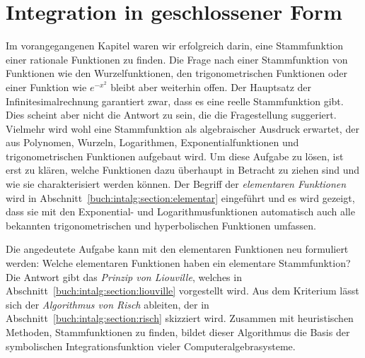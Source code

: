 %
%
%
\chapter{Integration in geschlossener Form
\label{chapter:intalg}}
Im vorangegangenen Kapitel waren wir erfolgreich darin, eine Stammfunktion
einer rationale Funktionen zu finden.
Die Frage nach einer Stammfunktion von Funktionen wie den
Wurzelfunktionen, den trigonometrischen Funktionen oder einer Funktion
wie $e^{-x^2}$ bleibt aber weiterhin offen.
Der Hauptsatz der Infinitesimalrechnung garantiert zwar, dass es
eine reelle Stammfunktion gibt.
Dies scheint aber nicht die Antwort zu sein, die die Fragestellung
suggeriert.
Vielmehr wird wohl eine Stammfunktion als algebraischer Ausdruck
erwartet, der aus Polynomen, Wurzeln, Logarithmen, Exponentialfunktionen
und trigonometrischen Funktionen aufgebaut wird.
Um diese Aufgabe zu lösen, ist erst zu klären, welche Funktionen
dazu überhaupt in Betracht zu ziehen sind und wie sie charakterisiert
werden können.
Der Begriff der \emph{elementaren Funktionen} wird in
Abschnitt~\ref{buch:intalg:section:elementar} eingeführt und es
wird gezeigt, dass sie mit den Exponential- und Logarithmusfunktionen
automatisch auch alle bekannten trigonometrischen und hyperbolischen
Funktionen umfassen.

Die angedeutete Aufgabe kann mit den elementaren Funktionen neu
formuliert werden: Welche elementaren Funktionen haben ein elementare
Stammfunktion?
Die Antwort gibt das \emph{Prinzip von Liouville}, welches in
Abschnitt~\ref{buch:intalg:section:liouville} vorgestellt wird.
Aus dem Kriterium lässt sich der \emph{Algorithmus von Risch}
ableiten, der in Abschnitt~\ref{buch:intalg:section:risch}
skizziert wird.
Zusammen mit heuristischen Methoden, Stammfunktionen zu finden,
bildet dieser Algorithmus die Basis der symbolischen Integrationsfunktion
vieler Computeralgebrasysteme.






\uebungsabschnitt

\begin{uebungsaufgaben}
\end{uebungsaufgaben}
\enduebungsabschnitt

